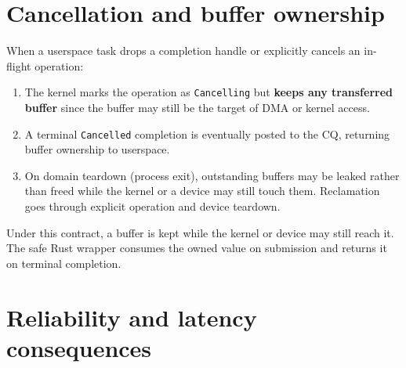 \section{Cancellation and buffer ownership}

When a userspace task drops a completion handle or explicitly cancels an
in-flight operation:

\begin{enumerate}
    \item The kernel marks the operation as \texttt{Cancelling} but \textbf{keeps
        any transferred buffer} since the buffer may still be the target of DMA or
        kernel access.
    \item A terminal \texttt{Cancelled} completion is eventually posted to the CQ,
        returning buffer ownership to userspace.
    \item On domain teardown (process exit), outstanding buffers may be leaked
        rather than freed while the kernel or a device may still touch them.
        Reclamation goes through explicit operation and device teardown.
\end{enumerate}

Under this contract, a buffer is kept while the kernel or device may still
reach it. The safe Rust wrapper consumes the owned value on submission and returns
it on terminal completion.

\section{Reliability and latency consequences}

